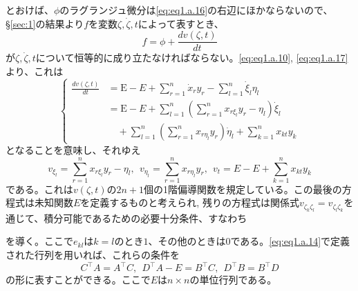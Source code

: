 \documentclass[dvipdfmx, leqno]{jsbook}
\begin{document}
    とおけば、$\phi$のラグランジュ微分は\eqref{eq:eq1.a.16}の右辺にほかならないので、\S\ref{sec:1}の結果より$f$を変数$\zeta, \dot{\zeta}, t$によって表すとき、
\begin{equation}
    f= \phi+ \frac{dv(\zeta, t)}{dt}
\end{equation}
    が$\zeta, \dot{\zeta}, t$について恒等的に成り立たなければならない。\eqref{eq:eq1.a.10}, \eqref{eq:eq1.a.17}より、これは
\begin{equation} \label{eq:eq1.a.18}
    \left\{ \begin{aligned} \frac{dv(\zeta, t)}{dt} &= \mathrm{E} - E + \sum_{r=1}^{n} \dot{x}_r y_r - \sum_{l=1}^{n} \dot{\xi}_l \eta_l \\ &= \mathrm{E} - E + \sum_{l=1}^{n} \left( \sum_{r=1}^{n} x_{r\xi_l} y_r - \eta_l \right) \dot{\xi}_l \\ &\quad + \sum_{l=1}^{n} \left( \sum_{r=1}^{n} x_{r\eta_l} y_r \right) \dot{\eta}_l + \sum_{k=1}^{n} x_{kt} y_k \end{aligned} \right.
\end{equation}
    となることを意味し、それゆえ
\begin{equation}
    v_{\xi_l}= \sum_{r= 1}^{n} x_{r\xi_l} y_r- \eta_l, \ \ v_{\eta_l}= \sum_{r= 1}^{n} x_{r\eta_l} y_r, \ \ v_t= E- E+ \sum_{k= 1}^{n} x_{kt} y_k
\end{equation}
    である。これは$v(\zeta, t)$の$2n+ 1$個の1階偏導関数を規定している。この最後の方程式は未知関数$E$を定義するものと考えられ, 残りの方程式は関係式$v_{\zeta_k \zeta_l}= v_{\zeta_l \zeta_k}$を通じて、積分可能であるための必要十分条件、すなわち

    を導く。ここで$e_{kl}$は$k= l$のとき$1$、その他のときは0である。\eqref{eq:eq1.a.14}で定義された行列を用いれば、これらの条件を
\begin{equation} \label{eq:eq1.a.19}
    C^{\top}A= A^{\top}C,\ \ D^{\top}A- E= B^{\top}C,\ \ D^{\top}B= B^{\top}D
\end{equation}
    の形に表すことができる。ここで$E$は$n\times n$の単位行列である。
\end{document}
